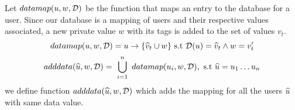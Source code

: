  Let $ datamap(u, w, \mathcal{D})$ be the function that maps an entry to the database for a user. Since our database is a mapping of users and their respective values associated, a new private value $ w$ with its tags is added to the set of values $ v_t$. 
 \vspace{-1mm}
 \[ datamap(u,w, \mathcal{D}) = u \to \{ \widehat{v}_t \cup w \} \  \text{s.t}\ \mathcal{D}(u) = \widehat{v}_t \land w = v_t'\]
 \[ adddata(\manyset u,w, \db) =
    \ \bigcup \limits_{i=1}^{n} {\ datamap(u_i,w, \db)}, \ \text{s.t}  \ \manyset{u} = u_1 \dots  u_n \\ \]
we define function $ adddata(\widehat{u} , w, \mathcal{D} )$  which adds the mapping for all the users $ \widehat{u}$ with same data value. 
